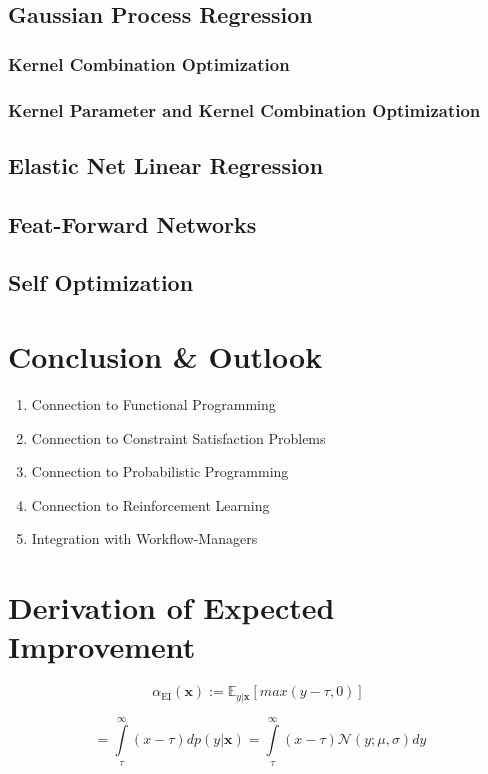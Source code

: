 \documentclass[english]{article}
\newcommand{\EI}{\operatorname{EI}}
\newcommand{\x}{\mathbf{x}}
\begin{document}
\subsection{Gaussian Process Regression}
\subsubsection{Kernel Combination Optimization}
\subsubsection{Kernel Parameter and Kernel Combination Optimization}
\subsection{Elastic Net Linear Regression}
\subsection{Feat-Forward Networks}
\subsection{Self Optimization}

\section{Conclusion \& Outlook}

\begin{enumerate}
  \item{Connection to Functional Programming}
  \item{Connection to Constraint Satisfaction Problems}
  \item{Connection to Probabilistic Programming}
  \item{Connection to Reinforcement Learning}
  \item{Integration with Workflow-Managers}
\end{enumerate}



\appendix

\section{Derivation of Expected Improvement}
\label{EI derivation}

$$\alpha_{\EI}(\x) := \mathbb{E}_{y|\x}[max(y-\tau, 0)]\ $$

$$= \int\limits_{\tau}^{\infty}(x-\tau)dp(y|\x) = \int\limits_{\tau}^{\infty}(x-\tau)\mathcal{N}(y;\mu,\sigma)dy$$
\end{document}
